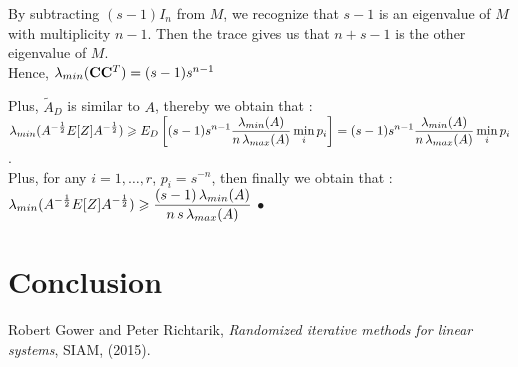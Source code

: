By subtracting $(s-1)I_{n}$ from $M$, we recognize that $s-1$ is an eigenvalue of $M$ with multiplicity $n-1$. Then the trace gives us that $n+s-1$ is the other eigenvalue of $M$.\\ 
Hence, $\lambda_{min}(\bold{C} \bold{C}^{T}) = (s-1)s^{n-1}$

Plus, $\tilde{A}_{D}$ is similar to $A$, thereby we obtain that :\\ 


$\displaystyle \lambda_{min}(A^{-\frac12}E[Z]A^{-\frac12} )  \geqslant  \displaystyle E_{D}\left[ (s-1)s^{n-1}\frac{\lambda_{min}(A)}{n \,\lambda_{max}(A)}  \min_{i} p_{i} \right] = (s-1)s^{n-1}\frac{\lambda_{min}(A)}{n \,\lambda_{max}(A)}  \min_{i} p_{i} $.\\

Plus, for any $i=1,\dots,r$, $p_{i} = s^{-n}$, then finally we obtain that :\\

$\displaystyle \lambda_{min}(A^{-\frac12}E[Z]A^{-\frac12} )  \geqslant  \frac{(s-1)\,\lambda_{min}(A)}{n \, s \,\lambda_{max}(A)} $ $\bullet$

\chapter{Conclusion}

\appendix
\begin{thebibliography}{1}

\bibitem{}
{\sc Robert Gower and Peter Richtarik}, {\em Randomized iterative methods for linear systems}, SIAM, 
  (2015).



\end{thebibliography}





